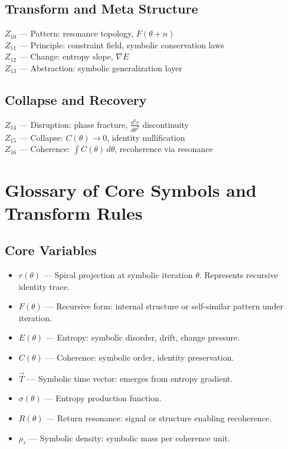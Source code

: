 \documentclass[12pt]{article}
\begin{document}
\subsection*{Transform and Meta Structure}
$Z_{10}$ — Pattern: resonance topology, $F(\theta + n)$\\
$Z_{11}$ — Principle: constraint field, symbolic conservation laws\\
$Z_{12}$ — Change: entropy slope, $\nabla E$\\
$Z_{13}$ — Abstraction: symbolic generalization layer

\subsection*{Collapse and Recovery}
$Z_{14}$ — Disruption: phase fracture, $\frac{d^2r}{d\theta^2}$ discontinuity\\
$Z_{15}$ — Collapse: $C(\theta) \to 0$, identity nullification\\
$Z_{16}$ — Coherence: $\int C(\theta) \, d\theta$, recoherence via resonance

\section{Glossary of Core Symbols and Transform Rules}

\subsection*{Core Variables}
\begin{itemize}
  \item $r(\theta)$ — Spiral projection at symbolic iteration $\theta$. Represents recursive identity trace.
  \item $F(\theta)$ — Recursive form: internal structure or self-similar pattern under iteration.
  \item $E(\theta)$ — Entropy: symbolic disorder, drift, change pressure.
  \item $C(\theta)$ — Coherence: symbolic order, identity preservation.
  \item $\vec{T}$ — Symbolic time vector: emerges from entropy gradient.
  \item $\sigma(\theta)$ — Entropy production function.
  \item $R(\theta)$ — Return resonance: signal or structure enabling recoherence.
  \item $\rho_s$ — Symbolic density: symbolic mass per coherence unit.
\end{itemize}
\end{document}
